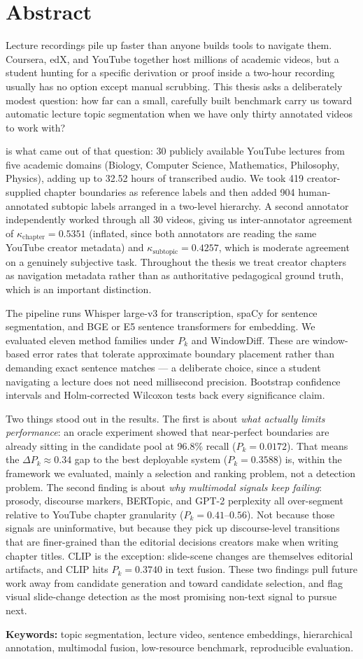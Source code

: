 \section*{Abstract}

Lecture recordings pile up faster than anyone builds tools to navigate them.
Coursera, edX, and YouTube together host millions of academic videos, but a
student hunting for a specific derivation or proof inside a two-hour recording
usually has no option except manual scrubbing. This thesis asks a deliberately
modest question: how far can a small, carefully built benchmark carry us toward
automatic lecture topic segmentation when we have only thirty annotated videos
to work with?

\textbf{\dataset{}} is what came out of that question: 30 publicly available
YouTube lectures from five academic domains (Biology, Computer Science,
Mathematics, Philosophy, Physics), adding up to 32.52 hours of transcribed
audio. We took 419 creator-supplied chapter boundaries as reference labels and
then added 904 human-annotated subtopic labels arranged in a two-level
hierarchy. A second annotator independently worked through all 30 videos,
giving us inter-annotator agreement of $\kappa_{\text{chapter}}=0.5351$
(inflated, since both annotators are reading the same YouTube creator metadata)
and $\kappa_{\text{subtopic}}=0.4257$, which is moderate agreement on a
genuinely subjective task. Throughout the thesis we treat creator chapters as
navigation metadata rather than as authoritative pedagogical ground truth,
which is an important distinction.

The pipeline runs Whisper large-v3 for transcription, spaCy for sentence
segmentation, and BGE or E5 sentence transformers for embedding. We evaluated
eleven method families under $P_k$ and WindowDiff. These are window-based error
rates that tolerate approximate boundary placement rather than demanding exact
sentence matches --- a deliberate choice, since a student navigating a lecture
does not need millisecond precision. Bootstrap confidence intervals and
Holm-corrected Wilcoxon tests back every significance claim.

Two things stood out in the results. The first is about \emph{what actually
limits performance}: an oracle experiment showed that near-perfect boundaries
are already sitting in the candidate pool at 96.8\% recall
($P_k=0.0172$). That means the $\Delta P_k \approx 0.34$ gap to the best
deployable system ($P_k=0.3588$) is, within the framework we evaluated, mainly
a selection and ranking problem, not a detection problem. The second finding is
about \emph{why multimodal signals keep failing}: prosody, discourse markers,
BERTopic, and GPT-2 perplexity all over-segment relative to YouTube chapter
granularity ($P_k = 0.41$--$0.56$). Not because those signals are
uninformative, but because they pick up discourse-level transitions that are
finer-grained than the editorial decisions creators make when writing chapter
titles. CLIP is the exception: slide-scene changes are themselves editorial
artifacts, and CLIP hits $P_k=0.3740$ in text fusion. These two findings pull
future work away from candidate generation and toward candidate selection, and
flag visual slide-change detection as the most promising non-text signal to
pursue next.

\vspace{1em}
\noindent\textbf{Keywords:} topic segmentation, lecture video, sentence
embeddings, hierarchical annotation, multimodal fusion, low-resource benchmark,
reproducible evaluation.
